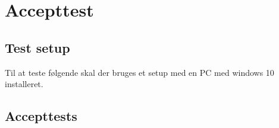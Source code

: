 
\chapter{Accepttest}


\section{Test setup}
Til at teste følgende skal der bruges et setup med en PC med windows 10 installeret. 
  
\section{Accepttests}






